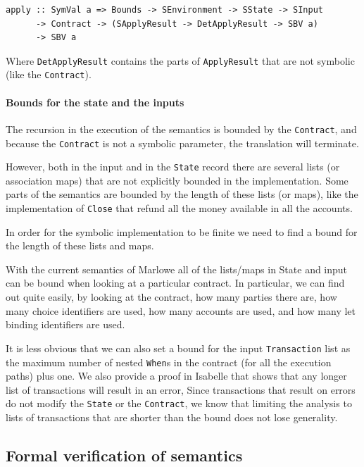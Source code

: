 \documentclass[runningheads]{llncs}
\begin{document}
\begin{verbatim}
apply :: SymVal a => Bounds -> SEnvironment -> SState -> SInput
      -> Contract -> (SApplyResult -> DetApplyResult -> SBV a)
      -> SBV a
\end{verbatim}

Where \texttt{DetApplyResult} contains the parts of \texttt{ApplyResult} that are not symbolic (like the \texttt{Contract}).

\paragraph{Bounds for the state and the inputs}

The recursion in the execution of the semantics is bounded by the \texttt{Contract}, and because the \texttt{Contract} is not a symbolic parameter, the translation will terminate.

However, both in the input and in the \texttt{State} record there are several lists (or association maps) that are not explicitly bounded in the implementation. Some parts of the semantics are bounded by the length of these lists (or maps), like the implementation of \texttt{Close} that refund all the money available in all the accounts.

In order for the symbolic implementation to be finite we need to find a bound for the length of these lists and maps.

With the current semantics of Marlowe all of the lists/maps in State and input can be bound when looking at a particular contract. In particular, we can find out quite easily, by looking at the contract, how many parties there are, how many choice identifiers are used, how many accounts are used, and how many let binding identifiers are used.

It is less obvious that we can also set a bound for the input \texttt{Transaction} list as the maximum number of nested \texttt{When}s in the contract (for all the execution paths) plus one. We also provide a proof in Isabelle that shows that any longer list of transactions will result in an error, Since transactions that result on errors do not modify the \texttt{State} or the \texttt{Contract}, we know that limiting the analysis to lists of transactions that are shorter than the bound does not lose generality.

\subsection{Formal verification of semantics\label{subsec:verification}}
\end{document}

